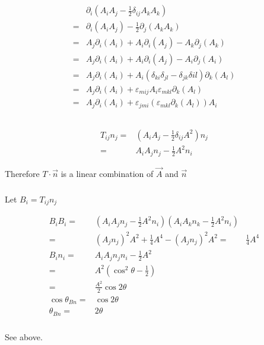 \documentclass[10pt,fleqn]{article}
\newcommand{\eqar}[1]
{
  \begin{align*}
    #1
  \end{align*}
}
\newcommand{\paren}[1]{{\left({#1}\right)}}
\begin{document}
\subsection{}
\eqar{
  &\partial_i\paren{A_iA_j-\frac12\delta_{ij}A_kA_k}\\
  =&\partial_i\paren{A_iA_j}-\frac12\partial_j\paren{A_kA_k}\\
  =&A_j\partial_i\paren{A_i}+A_i\partial_i\paren{A_j}-A_k\partial_j\paren{A_k}\\
  =&A_j\partial_i\paren{A_i}+A_i\partial_i\paren{A_j}-A_i\partial_j\paren{A_i}\\
  =&A_j\partial_i\paren{A_i}+A_i\paren{\delta_{ki}\delta_{jl}-\delta_{jk}\delta{il}}\partial_k\paren{A_l}\\
  =&A_j\partial_i\paren{A_i}+\varepsilon_{mij}A_i\varepsilon_{mkl}\partial_k\paren{A_l}\\
  =&A_j\partial_i\paren{A_i}+\varepsilon_{jmi}\paren{\varepsilon_{mkl}\partial_k\paren{A_l}}A_i
}
\subsection{}
\subsubsection{}
\eqar{
  T_{ij}n_j=&\paren{A_iA_j-\frac12\delta_{ij}A^2}n_j\\
  =&A_iA_jn_j-\frac12A^2n_i
}
Therefore $T\cdot\vec n$ is a linear combination of $\vec A$ and $\vec n$
\subsubsection{}
Let $B_i=T_{ij}n_j$
\eqar{
  B_iB_i=&\paren{A_iA_jn_j-\frac12A^2n_i}\paren{A_iA_kn_k-\frac12A^2n_i}\\
  =&\paren{A_jn_j}^2A^2+\frac14A^4-\paren{A_jn_j}^2A^2
  =&\frac14A^4\\
  B_in_i=&A_iA_jn_jn_i-\frac12A^2\\
  =&A^2\paren{\cos^2\theta-\frac12}\\
  =&\frac{A^2}2\cos2\theta\\
  \cos\theta_{Bn}=&\cos2\theta\\
  \theta_{Bn}=&2\theta
}
\subsubsection{}
See above.

\section{}
\end{document}
